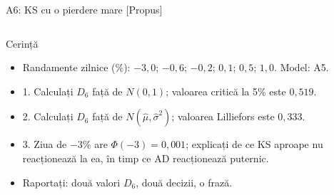 \begin{frame}{A6: KS cu o pierdere mare [Propus]}
\propsub
\itemsize{\scriptsize}
\begin{columns}[T]
\begin{column}{\taskw}
\begin{block}{Cerință}
\begin{itemize}
    \item Randamente zilnice (\%): $-3{,}0$; $-0{,}6$; $-0{,}2$; $0{,}1$; $0{,}5$; $1{,}0$. Model: A5.
    \item 1. Calculați $D_6$ față de $N(0, 1)$; valoarea critică la 5\% este $0{,}519$.
    \item 2. Calculați $D_6$ față de $N(\hat\mu, \hat\sigma^2)$; valoarea Lilliefors este $0{,}333$.
    \item 3. Ziua de $-3\%$ are $\Phi(-3) = 0{,}001$; explicați de ce KS aproape nu reacționează la ea, în timp ce AD reacționează puternic.
    \item Raportați: două valori $D_6$, două decizii, o frază.
\end{itemize}
\end{block}
\end{column}
\begin{column}{\solw}
\end{column}
\end{columns}
\end{frame}

